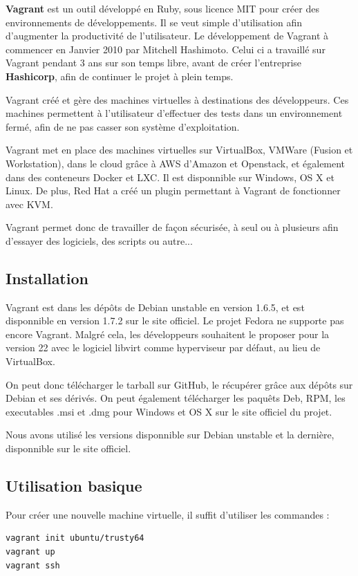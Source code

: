 \documentclass[12pt,a4paper]{article}
\begin{document}
\textbf{Vagrant} est un outil développé en Ruby, sous licence MIT pour créer des environnements de développements. Il se veut simple d'utilisation afin d'augmenter la productivité de l'utilisateur. Le développement de Vagrant à commencer en Janvier 2010 par Mitchell Hashimoto. Celui ci a travaillé sur Vagrant pendant 3 ans sur son temps libre, avant de créer l'entreprise \textbf{Hashicorp}, afin de continuer le projet à plein temps.

Vagrant créé et gère des machines virtuelles à destinations des développeurs. Ces machines permettent à l'utilisateur d'effectuer des tests dans un environnement fermé, afin de ne pas casser son système d'exploitation. 

Vagrant met en place des machines virtuelles sur VirtualBox, VMWare (Fusion et Workstation), dans le cloud grâce à AWS d'Amazon et Openstack, et également dans des conteneurs Docker et LXC. Il est disponnible sur Windows, OS X et Linux. De plus, Red Hat a créé un plugin permettant à Vagrant de fonctionner avec KVM.

Vagrant permet donc de travailler de façon sécurisée, à seul ou à plusieurs afin d'essayer des logiciels, des scripts ou autre...

\subsection{Installation}
Vagrant est dans les dépôts de Debian unstable en version 1.6.5, et est disponnible en version 1.7.2 sur le site officiel. Le projet Fedora ne supporte pas encore Vagrant. Malgré cela, les développeurs souhaitent le proposer pour la version 22 avec le logiciel libvirt comme hyperviseur par défaut, au lieu de VirtualBox.

On peut donc télécharger le tarball sur GitHub, le récupérer grâce aux dépôts sur Debian et ses dérivés. On peut également télécharger les paquêts Deb, RPM, les executables .msi et .dmg pour Windows et OS X sur le site officiel du projet.

Nous avons utilisé les versions disponnible sur Debian unstable et la dernière, disponnible sur le site officiel.

\subsection{Utilisation basique}

Pour créer une nouvelle machine virtuelle, il suffit d'utiliser les commandes :
\begin{lstlisting}
vagrant init ubuntu/trusty64
vagrant up
vagrant ssh
\end{lstlisting}
\end{document}
